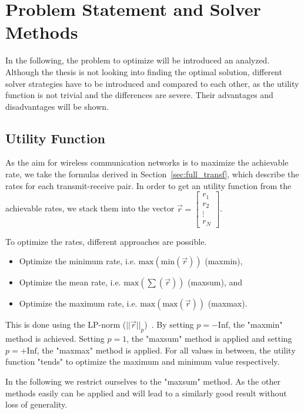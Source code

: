 \chapter{Problem Statement and Solver Methods}
\label{sec:solver}

In the following, the problem to optimize will be introduced an analyzed.
Although the thesis is not looking into finding the optimal solution, different solver strategies have to be introduced and compared to each other, as the utility function is not trivial and the differences are severe.
Their advantages and disadvantages will be shown.


\section{Utility Function}
\label{sec:utility_function}
As the aim for wireless communication networks is to maximize the achievable rate, we take the formulas derived in Section~\ref{sec:full_transf}, which describe the rates for each transmit-receive pair.
In order to get an utility function from the achievable rates, we stack them into the vector $\vec{r} = \begin{bmatrix}
r_1 \\ r_2 \\ \vdots \\ r_N
\end{bmatrix}$.

To optimize the rates, different approaches are possible.
\begin{itemize}
\item Optimize the minimum rate, i.e. $\text{max}\left(\text{min}(\vec{r})\right)$ (maxmin),
\item Optimize the mean rate, i.e. $\text{max}\left(\sum(\vec{r})\right)$ (maxsum), and
\item Optimize the maximum rate, i.e. $\text{max}\left(\text{max}(\vec{r})\right)$ (maxmax).
\end{itemize}

This is done using the LP-norm ($||\vec{r}||_p$)~\cite{wiki:lp_space}.
By setting $p = -\text{Inf}$, the "maxmin" method is achieved.
Setting $p = 1$, the "maxsum" method is applied and setting $p = +\text{Inf}$, the "maxmax" method is applied.
For all values in between, the utility function "tends" to optimize the maximum and minimum value respectively.

In the following we restrict ourselves to the "maxsum" method.
As the other methods easily can be applied and will lead to a similarly good result without loss of generality.

